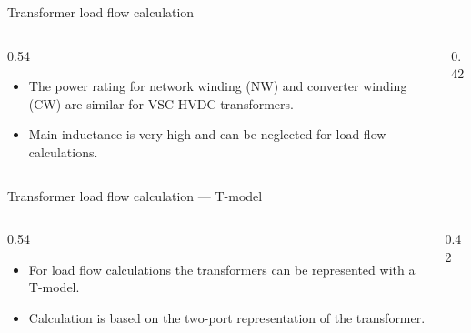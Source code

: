\begin{frame}{Transformer load flow calculation}
  \begin{columns}[c,onlytextwidth]
    \begin{column}{0.54\textwidth}
      \begin{itemize}
        \setlength{\itemsep}{0.5em}
        \item The power rating for network winding (NW) and converter
              winding (CW) are similar for VSC-HVDC transformers.
        \item Main inductance is very high and can be neglected for load
              flow calculations.
      \end{itemize}
    \end{column}
    \begin{column}{0.42\textwidth}
      \centering
    \end{column}
  \end{columns}
\end{frame}

\begin{frame}{Transformer load flow calculation --- T-model}
  \begin{columns}[c,onlytextwidth]
    \begin{column}{0.54\textwidth}
      \begin{itemize}
        \setlength{\itemsep}{0.5em}
        \item For load flow calculations the transformers can be represented
              with a T-model.
        \item Calculation is based on the two-port representation of the
              transformer.
      \end{itemize}
    \end{column}
    \begin{column}{0.42\textwidth}
      \centering
    \end{column}
  \end{columns}
\end{frame}

